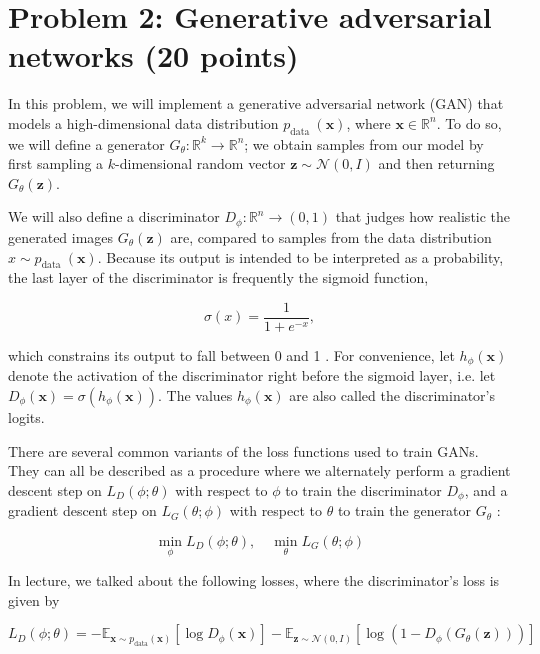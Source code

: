 \documentclass{article}
\theoremstyle{case}
\theoremstyle{definition}
\begin{document}
\section*{Problem 2: Generative adversarial networks (20 points)}
In this problem, we will implement a generative adversarial network (GAN) that models a high-dimensional data distribution $p_{\text {data }}(\boldsymbol{x})$, where $\boldsymbol{x} \in \mathbb{R}^{n}$. To do so, we will define a generator $G_{\theta}: \mathbb{R}^{k} \rightarrow \mathbb{R}^{n}$; we obtain samples from our model by first sampling a $k$-dimensional random vector $\boldsymbol{z} \sim \mathcal{N}(0, I)$ and then returning $G_{\theta}(\boldsymbol{z})$.

We will also define a discriminator $D_{\phi}: \mathbb{R}^{n} \rightarrow(0,1)$ that judges how realistic the generated images $G_{\theta}(\boldsymbol{z})$ are, compared to samples from the data distribution $x \sim p_{\text {data }}(\boldsymbol{x})$. Because its output is intended to be interpreted as a probability, the last layer of the discriminator is frequently the sigmoid function,

$$
\sigma(x)=\frac{1}{1+e^{-x}},
$$

which constrains its output to fall between 0 and 1 . For convenience, let $h_{\phi}(\boldsymbol{x})$ denote the activation of the discriminator right before the sigmoid layer, i.e. let $D_{\phi}(\boldsymbol{x})=\sigma\left(h_{\phi}(\boldsymbol{x})\right)$. The values $h_{\phi}(\boldsymbol{x})$ are also called the discriminator's logits.

There are several common variants of the loss functions used to train GANs. They can all be described as a procedure where we alternately perform a gradient descent step on $L_{D}(\phi ; \theta)$ with respect to $\phi$ to train the discriminator $D_{\phi}$, and a gradient descent step on $L_{G}(\theta ; \phi)$ with respect to $\theta$ to train the generator $G_{\theta}$ :

$$
\min _{\phi} L_{D}(\phi ; \theta), \quad \min _{\theta} L_{G}(\theta ; \phi)
$$

In lecture, we talked about the following losses, where the discriminator's loss is given by

$$
L_{D}(\phi ; \theta)=-\mathbb{E}_{\boldsymbol{x} \sim p_{\mathrm{data}}(\boldsymbol{x})}\left[\log D_{\phi}(\boldsymbol{x})\right]-\mathbb{E}_{\boldsymbol{z} \sim \mathcal{N}(0, I)}\left[\log \left(1-D_{\phi}\left(G_{\theta}(\boldsymbol{z})\right)\right)\right]
$$
\end{document}
